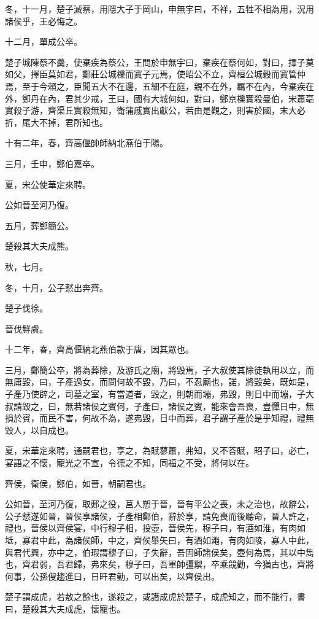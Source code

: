\begin{pinyinscope}
冬，十一月，楚子滅蔡，用隱大子于岡山，申無宇曰，不祥，五牲不相為用，況用諸侯乎，王必悔之。

十二月，單成公卒。

楚子城陳蔡不羹，使棄疾為蔡公，王問於申無宇曰，棄疾在蔡何如，對曰，擇子莫如父，擇臣莫如君，鄭莊公城櫟而寘子元焉，使昭公不立，齊桓公城穀而寘管仲焉，至于今賴之，臣聞五大不在邊，五細不在庭，親不在外，羈不在內，今棄疾在外，鄭丹在內，君其少戒，王曰，國有大城何如，對曰，鄭京櫟實殺曼伯，宋蕭亳實殺子游，齊渠丘實殺無知，衛蒲戚實出獻公，若由是觀之，則害於國，末大必折，尾大不掉，君所知也。

十有二年，春，齊高偃帥師納北燕伯于陽。

三月，壬申，鄭伯嘉卒。

夏，宋公使華定來聘。

公如晉至河乃復。

五月，葬鄭簡公。

楚殺其大夫成熊。

秋，七月。

冬，十月，公子憖出奔齊。

楚子伐徐。

晉伐鮮虞。

十二年，春，齊高偃納北燕伯款于唐，因其眾也。

三月，鄭簡公卒，將為葬除，及游氏之廟，將毀焉，子大叔使其除徒執用以立，而無庸毀，曰，子產過女，而問何故不毀，乃曰，不忍廟也，諾，將毀矣，既如是，子產乃使辟之，司墓之室，有當道者，毀之，則朝而塴，弗毀，則日中而塴，子大叔請毀之，曰，無若諸侯之賓何，子產曰，諸侯之賓，能來會吾喪，豈憚日中，無損於賓，而民不害，何故不為，遂弗毀，日中而葬，君子謂子產於是乎知禮，禮無毀人，以自成也。

夏，宋華定來聘，通嗣君也，享之，為賦蓼蕭，弗知，又不荅賦，昭子曰，必亡，宴語之不懷，寵光之不宣，令德之不知，同福之不受，將何以在。

齊侯，衛侯，鄭伯，如晉，朝嗣君也。

公如晉，至河乃復，取郠之役，莒人愬于晉，晉有平公之喪，未之治也，故辭公，公子憖遂如晉，晉侯享諸侯，子產相鄭伯，辭於享，請免喪而後聽命，晉人許之，禮也，晉侯以齊侯宴，中行穆子相，投壺，晉侯先，穆子曰，有酒如淮，有肉如坻，寡君中此，為諸侯師，中之，齊侯舉矢曰，有酒如澠，有肉如陵，寡人中此，與君代興，亦中之，伯瑕謂穆子曰，子失辭，吾固師諸侯矣，壺何為焉，其以中雋也，齊君弱，吾君歸，弗來矣，穆子曰，吾軍帥彊禦，卒乘競勸，今猶古也，齊將何事，公孫傁趨進曰，日旰君勤，可以出矣，以齊侯出。

楚子謂成虎，若敖之餘也，遂殺之，或譖成虎於楚子，成虎知之，而不能行，書曰，楚殺其大夫成虎，懷寵也。


\end{pinyinscope}
